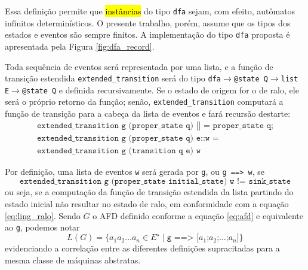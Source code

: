 Essa definição permite que \hl{instâncias} do tipo \texttt{dfa} sejam, com efeito, autômatos infinitos determinísticos. O presente trabalho, porém, assume que os tipos dos estados e eventos são sempre finitos. A implementação do tipo \texttt{dfa} proposta é apresentada pela Figura \ref{fig:dfa_record}.


Toda sequência de eventos será representada por uma lista, e a função de transição estendida \texttt{extended\_transition} será do tipo \texttt{dfa$\rightarrow$@state Q$\rightarrow$list E$\rightarrow$@state Q} e definida recursivamente. Se o estado de origem for o de ralo, ele será o próprio retorno da função; senão, \texttt{extended\_transition} computará a função de transição para a cabeça da lista de eventos e fará recursão destarte: \begin{gather*}
\texttt{extended\_transition g (proper\_state q) [] = proper\_state q;}\\\texttt{extended\_transition g (proper\_state q) e::w =}\\\texttt{extended\_transition g (transition q e) w}\end{gather*}

Por definição, uma lista de eventos \texttt{w} será gerada por \texttt{g}, ou \texttt{g ==> w}, se $$\texttt{extended\_transition g (proper\_state initial\_state) w != sink\_state}$$ ou seja, se a computação da função de transição estendida da lista partindo do estado inicial não resultar no estado de ralo, em conformidade com a equação \ref{eq:ling_ralo}. Sendo $G$ o AFD definido conforme a equação \ref{eq:afd} e equivalente ao \texttt{g}, podemos notar $$L(G) = \{ a_1a_2...a_n \in E^\star \mid \texttt{g ==> [$a_1$;$a_2$;$...$;$a_n$]} \}$$ evidenciando a correlação entre as diferentes definições supracitadas para a mesma classe de máquinas abstratas.